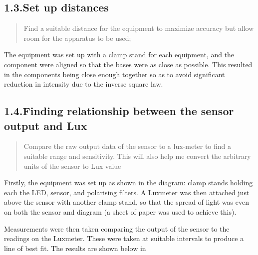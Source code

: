 \documentclass{article}
\begin{document}
\subsection{1.3.\hspace*{0.5em}Set up distances}\label{sec-set-up-distances}%

\begin{quote}%

\noindent{}Find a suitable distance for the equipment to maximize accuracy but allow room for the apparatus to be used;%
\end{quote}%

\noindent{}The equipment was set up with a clamp stand for each equipment, and the component were aligned so that the bases were as close as possible. This resulted in the components being close enough together so as to avoid significant reduction in intensity due to the inverse square law.%

\subsection{1.4.\hspace*{0.5em}Finding relationship between the sensor output and Lux}\label{sec-finding-relationship-between-the-sensor-output-and-lux}%

\begin{quote}%

\noindent{}Compare the raw output data of the sensor to a lux-meter to find a suitable range and sensitivity. This will also help me convert the arbitrary units of the sensor to Lux value%
\end{quote}%

\noindent{}Firstly, the equipment was set up as shown in the diagram: clamp stands holding each the LED, sensor, and polarising filters. A Luxmeter was then attached just above the sensor with another clamp stand, so that the spread of light was even on both the sensor and diagram (a sheet of paper was used to achieve this).%

Measurements were then taken comparing the output of the sensor to the readings on the Luxmeter. These were taken at suitable intervals to produce a line of best fit. The results are shown below in~%
\end{document}
